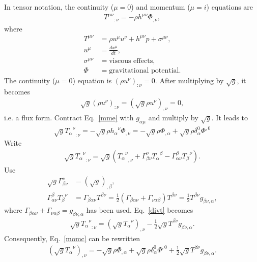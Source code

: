 \documentclass{article}
\begin{document}
In tensor notation, the continuity ($\mu=0$) and momentum ($\mu=i$) equations are
\begin{align}
{T^{\mu \nu}}_{:\nu}=-\rho h^{\mu \nu} \Phi_{,\nu}, \label{mme}
\end{align}
where
\begin{align}
T^{\mu \nu}&=\rho u^{\mu} u^{\nu} + h^{\mu \nu} p + \sigma^{\mu \nu}, \\
u^{\mu}&=\frac{dx^\mu}{dt}, \\
\sigma^{\mu \nu}&=\text{viscous effects}, \\
\Phi&=\text{gravitational potential}.
\end{align}
The continuity ($\mu=0$) equation is $(\rho u^{\nu})_{:\nu}=0$. After multiplying by $\sqrt{g}$, it becomes
\begin{align}
\sqrt{g} (\rho u^{\nu})_{:\nu} = (\sqrt{g} \rho u^{\nu})_{,\nu} = 0,
\end{align}
i.e. a flux form. Contract Eq.\ \eqref{mme} with $g_{\alpha \mu}$ and multiply by $\sqrt{g}$. It leads to
\begin{align}
\sqrt{g} {{T_\alpha}^\nu}_{:\nu}=- \sqrt{g} \rho {h_\alpha}^\nu \Phi_{,\nu} = - \sqrt{g} \rho \Phi_{,\alpha} + \sqrt{g} \rho \delta_\alpha^0 \Phi^{,0} \label{momc}
\end{align}
Write
\begin{align}
\sqrt{g} {{T_\alpha}^\nu}_{:\nu}=\sqrt{g} \left( {{T_\alpha}^\nu}_{,\nu} + \Gamma^\nu_{\beta\nu} {T_\alpha}^\beta - \Gamma^\beta_{\alpha\nu}{T_{\beta}}^\nu  \right). \label{divt}
\end{align}
Use
\begin{align}
\sqrt{g} \Gamma^\nu_{\beta\nu} &= (\sqrt{g})_{,\beta}, \\
\Gamma^\beta_{\alpha\nu}{T_{\beta}}^\nu &= \Gamma_{\beta\alpha\nu}T^{\beta\nu}=\frac{1}{2}\left( \Gamma_{\beta\alpha\nu} + \Gamma_{\nu\alpha\beta} \right)T^{\beta\nu}=\frac{1}{2}T^{\beta\nu} g_{\beta\nu , \alpha},
\end{align}
where $\Gamma_{\beta\alpha\nu} + \Gamma_{\nu\alpha\beta}=g_{\beta\nu , \alpha}$ has been used. Eq.\ \eqref{divt} becomes
\begin{align}
\sqrt{g} {{T_\alpha}^\nu}_{:\nu}=\left( \sqrt{g}{{T_\alpha}^\nu}\right)_{,\nu} - \frac{1}{2} \sqrt{g} T^{\beta\nu} g_{\beta\nu , \alpha}.
\end{align}
Consequently, Eq.\ \eqref{momc} can be rewritten
\begin{align}
\left( \sqrt{g}{{T_\alpha}^\nu}\right)_{,\nu} = - \sqrt{g} \rho \Phi_{,\alpha} + \sqrt{g} \rho \delta_\alpha^0 \Phi^{,0} + \frac{1}{2} \sqrt{g} T^{\beta\nu} g_{\beta\nu , \alpha}.
\end{align}
\end{document}
